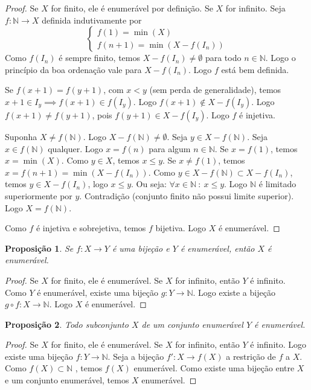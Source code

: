 \documentclass{article}
\theoremstyle{plain}
\newtheorem{prop}{Proposição}[section]
\theoremstyle{definition}
\theoremstyle{remark}
\begin{document}
\begin{proof}
	Se $X$ for finito, ele é enumerável por definição. Se $X$ for infinito. Seja $f:  \mathbb{N} \to X$ definida indutivamente por $$\begin{cases} f(1) = \min (X) \\ 
	f(n+1) = \min( X- f(I_n)) \end{cases}$$
	Como $f(I_n)$ é sempre finito, temos $X-f(I_n) \neq \emptyset$ para todo $n \in \mathbb{N}$. Logo o princípio da boa ordenação vale para $X - f(I_n)$. Logo $f$ está bem definida. 

	Se $f(x+1) = f(y+1)$, com $x<y$ (sem perda de generalidade), temos $x+1 \in I_y \implies f(x+1) \in f(I_y)$. Logo $f(x+1) \not \in X - f(I_y)$. Logo $f(x+1) \neq f(y+1)$, pois $f(y+1) \in X - f(I_y)$. Logo $f$ é injetiva.
	
	Suponha $X \neq f(\mathbb{N})$. Logo $X - f(\mathbb{N}) \neq \emptyset$. Seja $y \in X - f(\mathbb{N})$.  Seja $x\in f(\mathbb{N})$ qualquer. Logo $x = f(n)$ para algum $n \in \mathbb{N}$. Se $x = f(1)$, temos $x = \min(X)$. Como $y \in X$, temos $x \leq y$. Se $x\neq f(1)$, temos $x = f(n+1) = \min (X - f(I_n))$. Como $y \in X - f(\mathbb{N}) \subset X - f(I_n)$, temos $y \in X - f(I_n)$, logo $x\leq y$. Ou seja: $\forall x \in \mathbb{N} \: : \: x\leq y$. Logo $\mathbb{N}$ é limitado superiormente por $y$.  Contradição (conjunto finito não possui limite superior). Logo $X = f(\mathbb{N})$.

	Como $f$ é injetiva e sobrejetiva, temos $f$ bijetiva. Logo $X$ é enumerável.

\end{proof}
\begin{prop}
	Se $f:X\to Y$ é uma bijeção e $Y$ é enumerável, então $X$ é enumerável.
\end{prop}
\begin{proof}
	Se $X$ for finito, ele é enumerável. Se $X$ for infinito,  então $Y$ é infinito.  Como $Y$ é enumerável,  existe uma bijeção $g: Y \to \mathbb{N}$. Logo existe a bijeção $g\circ f: X \to \mathbb{N}$. Logo $X$ é enumerável.
\end{proof}
\begin{prop}
	Todo subconjunto $X$ de um conjunto enumerável $Y$ é enumerável.
\end{prop}
\begin{proof}
	Se $X$ for finito, ele é enumerável. Se $X$ for infinito,  então $Y$ é infinito. Logo existe uma bijeção $f: Y \to \mathbb{N}$. Seja  a bijeção $f':X\to f(X)$ a restrição de $f$ a $X$. Como $f(X)\subset \mathbb{N}$ , temos $f(X)$ enumerável. Como existe uma bijeção entre $X$ e um conjunto enumerável, temos $X$  enumerável.
\end{proof}
\end{document}
